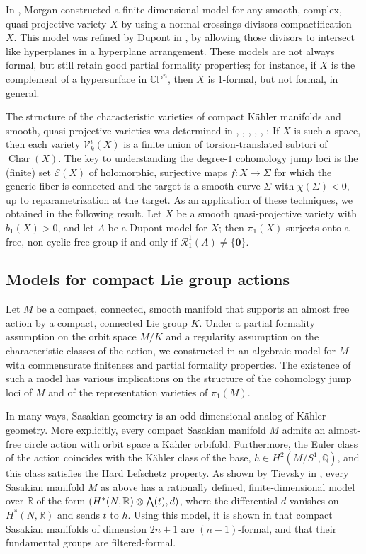 \documentclass{article}
\numberwithin{equation}{section}
\theoremstyle{definition}
\newcommand{\Q}{\mathbb{Q}}
\newcommand{\R}{\mathbb{R}}
\newcommand{\CP}{\mathbb{CP}}
\newcommand{\VV}{\mathcal{V}}
\newcommand{\RR}{\mathcal{R}}
\DeclareMathOperator{\Char}{Char}
\newcommand{\zero}{\mathbf{0}}
\newcommand{\bwedge}{\mbox{\normalsize $\bigwedge$}}
\begin{document}
In \cite{Mo}, Morgan constructed a finite-dimensional model for 
any smooth, complex, quasi-projec\-tive variety $X$ by using 
a normal crossings divisors compactification $\overline{X}$. 
This model was refined by Dupont in \cite{Dp15}, by allowing 
those divisors to intersect like hyperplanes in a hyperplane 
arrangement. These models are not always formal, 
but still retain good partial formality properties; for instance, if $X$ is the 
complement of a hypersurface in $\CP^n$, then $X$ is $1$-formal, but 
not formal, in general.

The structure of the characteristic varieties of compact K\"{a}hler manifolds 
and smooth, quasi-projective varieties was determined in 
\cite{Cat91}, \cite{Be92}, \cite{GL87}, \cite{Si93}, \cite{Ar}, \cite{BW-asens}: 
If $X$ is such a space, then each variety $\VV^i_k(X)$ is a finite union of 
torsion-translated subtori of $\Char(X)$. The key to understanding the degree-$1$ 
cohomology jump loci is the (finite) set $\mathcal{E}(X)$ of holomorphic,  
surjective maps $f\colon X\to \Sigma$ for which the generic fiber is connected 
and the target is a smooth curve $\Sigma$ with $\chi(\Sigma)<0$, up to reparametrization 
at the target. As an application of these techniques, we obtained in \cite{PS-jlms} 
the following result. Let $X$ be a smooth quasi-projective variety with $b_1(X)>0$, 
and let $A$ be a Dupont model for $X$; then $\pi_1(X)$ surjects onto a free, non-cyclic 
free group if and only if $\RR^1_1(A)\ne \{ \zero\}$.

\subsection{Models for compact Lie group actions}
\label{subsec:intro-algmod2}

Let $M$ be a compact, connected, smooth manifold that 
supports an almost free action by a compact, connected Lie group $K$.  
Under a partial formality assumption on the orbit space $M/K$ 
and a regularity assumption on the characteristic classes 
of the action, we constructed in \cite{PS-jlms} an algebraic model for $M$
with commensurate finiteness and partial formality properties.  
The existence of such a model has various implications on the 
structure of the cohomology jump loci of  $M$ and of the 
representation varieties of $\pi_1(M)$.  

In many ways, Sasakian geometry is an odd-dimensional analog of K\"{a}hler 
geometry.  More explicitly, every compact Sasakian manifold $M$ 
admits an almost-free circle action with orbit space 
a K\"{a}hler orbifold.  Furthermore, the Euler class of the action 
coincides with the K\"{a}hler class of the base, $h\in H^2(M/S^1,\Q)$, 
and this class satisfies the Hard Lefschetz property.
As shown by Tievsky in \cite{Ti}, every Sasakian manifold $M$ as above 
has a rationally defined, finite-dimensional model over $\R$ of the form 
$(H^{*}(N,\R)\otimes  \bwedge(t), d)$, 
where the differential $d$ vanishes on $H^{*}(N,\R)$ and sends $t$ to $h$.  
Using this model, it is shown in \cite{PS-jlms}  that compact Sasakian 
manifolds of dimension $2n+1$ are 
$(n-1)$-formal, and that their fundamental groups are filtered-formal. 
\end{document}
